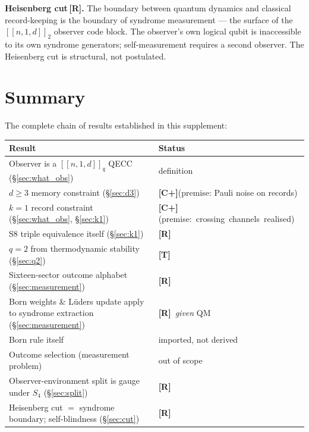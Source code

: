 \documentclass[11pt,a4paper]{article}
\newcommand{\Rmark}{\textcolor{green!50!black}{\textbf{[R]}}}
\newcommand{\Cpmark}{\textcolor{blue!70!black}{\textbf{[C+]}}}
\newcommand{\Tmark}{\textcolor{orange!70!black}{\textbf{[T]}}}
\newcommand{\Cq}[4]{[\![#1,#2,#3]\!]_{#4}}
\begin{document}
\begin{mdframed}[backgroundcolor=Rbg,linecolor=Rcolor,linewidth=1.5pt]
\textbf{Heisenberg cut\,\Rmark.}\quad
The boundary between quantum dynamics and classical record-keeping is the boundary of syndrome measurement --- the surface of the $\Cq{n}{1}{d}{2}$ observer code block. The observer's own logical qubit is inaccessible to its own syndrome generators; self-measurement requires a second observer. The Heisenberg cut is structural, not postulated.
\end{mdframed}

\newpage

\section{Summary}
\label{sec:summary}

The complete chain of results established in this supplement:

\begin{center}
\renewcommand{\arraystretch}{1.25}
\small
\begin{tabular}{@{}p{7.6cm}p{6.4cm}@{}}
\toprule
\textbf{Result} & \textbf{Status} \\
\midrule
Observer is a $\Cq{n}{1}{d}{q}$ QECC (\S\ref{sec:what_obs})   & definition \\
$d\geq3$ memory constraint (\S\ref{sec:d3})                   & \Cpmark\;(premise: Pauli noise on records) \\
$k=1$ record constraint (\S\ref{sec:what_obs}, \S\ref{sec:k1})
                    & \Cpmark\;(premise:~crossing~channels~realised) \\
S8 triple equivalence itself (\S\ref{sec:k1})                 & \Rmark \\
$q=2$ from thermodynamic stability (\S\ref{sec:q2})           & \Tmark \\
Sixteen-sector outcome alphabet (\S\ref{sec:measurement})     & \Rmark \\
Born weights \& L\"uders update apply to syndrome extraction
  (\S\ref{sec:measurement})                    & \Rmark\ \emph{given} QM \\
Born rule itself                    & imported, not derived \\
Outcome selection (measurement problem)        & out of scope \\
Observer-environment split is gauge under $S_4$ (\S\ref{sec:split})
                                                              & \Rmark \\
Heisenberg cut $=$ syndrome boundary; self-blindness (\S\ref{sec:cut})
                                                              & \Rmark \\
\bottomrule
\end{tabular}
\end{center}
\end{document}
